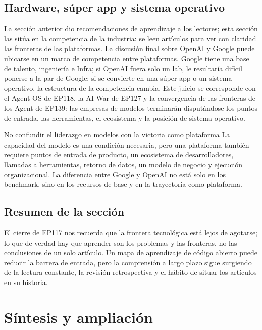\documentclass[a4paper]{article}
\begin{document}
\subsection{Hardware, súper app y sistema operativo}

La sección anterior dio recomendaciones de aprendizaje a los lectores; esta sección las sitúa en la competencia de la industria: se leen artículos para ver con claridad las fronteras de las plataformas. La discusión final sobre OpenAI y Google puede ubicarse en un marco de competencia entre plataformas. Google tiene una base de talento, ingeniería e Infra; si OpenAI fuera solo un lab, le resultaría difícil ponerse a la par de Google; si se convierte en una súper app o un sistema operativo, la estructura de la competencia cambia. Este juicio se corresponde con el Agent OS de EP118, la AI War de EP127 y la convergencia de las fronteras de los Agent de EP139: las empresas de modelos terminarán disputándose los puntos de entrada, las herramientas, el ecosistema y la posición de sistema operativo.

\begin{warningbox}{No confundir el liderazgo en modelos con la victoria como plataforma}
La capacidad del modelo es una condición necesaria, pero una plataforma también requiere puntos de entrada de producto, un ecosistema de desarrolladores, llamadas a herramientas, retorno de datos, un modelo de negocio y ejecución organizacional. La diferencia entre Google y OpenAI no está solo en los benchmark, sino en los recursos de base y en la trayectoria como plataforma.
\end{warningbox}

\subsection{Resumen de la sección}

El cierre de EP117 nos recuerda que la frontera tecnológica está lejos de agotarse; lo que de verdad hay que aprender son los problemas y las fronteras, no las conclusiones de un solo artículo. Un mapa de aprendizaje de código abierto puede reducir la barrera de entrada, pero la comprensión a largo plazo sigue surgiendo de la lectura constante, la revisión retrospectiva y el hábito de situar los artículos en su historia.
\section{Síntesis y ampliación}
\end{document}
